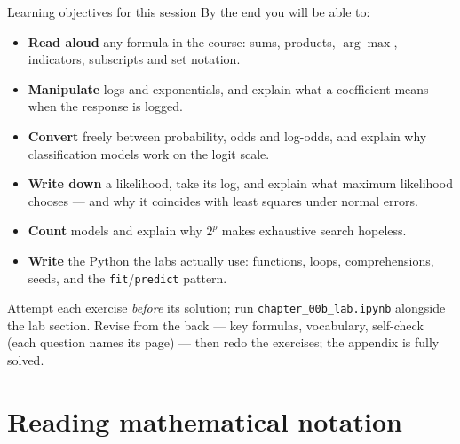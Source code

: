 \documentclass[aspectratio=169,11pt]{beamer}
\begin{document}
\begin{frame}{Learning objectives for this session}
  \footnotesize
  By the end you will be able to:
  \begin{itemize}
    \item \textbf{Read aloud} any formula in the course: sums, products,
          $\arg\max$, indicators, subscripts and set notation.
    \item \textbf{Manipulate} logs and exponentials, and explain what a
          coefficient means when the response is logged.
    \item \textbf{Convert} freely between probability, odds and log-odds, and
          explain why classification models work on the logit scale.
    \item \textbf{Write down} a likelihood, take its log, and explain what
          maximum likelihood chooses --- and why it coincides with least
          squares under normal errors.
    \item \textbf{Count} models and explain why $2^p$ makes exhaustive search
          hopeless.
    \item \textbf{Write} the Python the labs actually use: functions, loops,
          comprehensions, seeds, and the \texttt{fit}/\texttt{predict} pattern.
  \end{itemize}
  \begin{readme}
    \footnotesize Attempt each exercise \emph{before} its solution; run
    \texttt{chapter\_00b\_lab.ipynb} alongside the lab section. Revise from the
    back --- key formulas, vocabulary, self-check (each question names its
    page) --- then redo the exercises; the appendix is fully solved.
  \end{readme}
\end{frame}




\section[Mathematical notation]{Reading mathematical notation}
\end{document}
